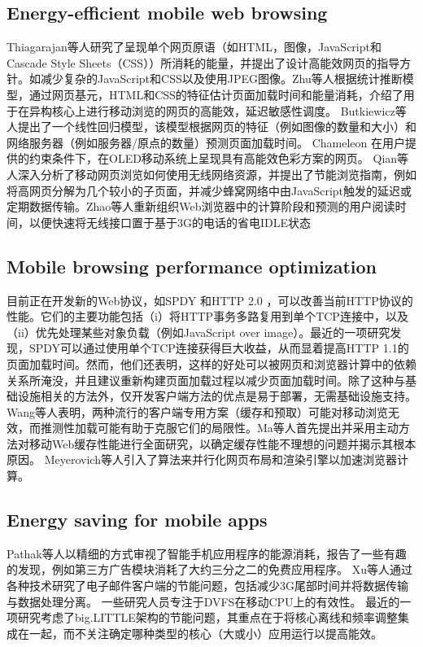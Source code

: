 \documentclass{sig-alternate-05-2015}
\begin{document}
\subsection{Energy-efficient mobile web browsing}

Thiagarajan等人\cite{13}研究了呈现单个网页原语（如HTML，图像，JavaScript和Cascade Style Sheets（CSS））所消耗的能量，并提出了设计高能效网页的指导方针。如减少复杂的JavaScript和CSS以及使用JPEG图像。Zhu等人\cite{14}根据统计推断模型，通过网页基元，HTML和CSS的特征估计页面加载时间和能量消耗，介绍了用于在异构核心上进行移动浏览的网页的高能效，延迟敏感性调度。 Butkiewicz等人\cite{15}提出了一个线性回归模型，该模型根据网页的特征（例如图像的数量和大小）和网络服务器（例如服务器/原点的数量）预测页面加载时间。 Chameleon \cite{16}\cite{17}在用户提供的约束条件下，在OLED移动系统上呈现具有高能效色彩方案的网页。 Qian等人\cite{18}深入分析了移动网页浏览如何使用无线网络资源，并提出了节能浏览指南，例如将高网页分解为几个较小的子页面，并减少蜂窝网络中由JavaScript触发的延迟或定期数据传输。Zhao等人\cite{19}重新组织Web浏览器中的计算阶段和预测的用户阅读时间，以便快速将无线接口置于基于3G的电话的省电IDLE状态

\subsection{Mobile browsing performance optimization}

目前正在开发新的Web协议，如SPDY \cite{20}和HTTP 2.0 \cite{21}，可以改善当前HTTP协议的性能。它们的主要功能包括（i）将HTTP事务多路复用到单个TCP连接中，以及（ii）优先处理某些对象负载（例如JavaScript over image）。最近的一项研究\cite{22}发现，SPDY可以通过使用单个TCP连接获得巨大收益，从而显着提高HTTP 1.1的页面加载时间。然而，他们还表明，这样的好处可以被网页和浏览器计算中的依赖关系所淹没，并且建议重新构建页面加载过程以减少页面加载时间。除了这种与基础设施相关的方法外，仅开发客户端方法的优点是易于部署，无需基础设施支持。 Wang等人\cite{23}表明，两种流行的客户端专用方案（缓存和预取）可能对移动浏览无效，而推测性加载可能有助于克服它们的局限性。Ma等人\cite{24}首先提出并采用主动方法对移动Web缓存性能进行全面研究，以确定缓存性能不理想的问题并揭示其根本原因。 Meyerovich等人\cite{25}引入了算法来并行化网页布局和渲染引擎以加速浏览器计算。

\subsection{Energy saving for mobile apps}

Pathak等人\cite{26}以精细的方式审视了智能手机应用程序的能源消耗，报告了一些有趣的发现，例如第三方广告模块消耗了大约三分之二的免费应用程序。 Xu等人\cite{27}通过各种技术研究了电子邮件客户端的节能问题，包括减少3G尾部时间并将数据传输与数据处理分离。 一些研究人员专注于DVFS在移动CPU上的有效性。 最近的一项研究\cite{28}考虑了big.LITTLE架构的节能问题，其重点在于将核心离线和频率调整集成在一起，而不关注确定哪种类型的核心（大或小）应用运行以提高能效。
\end{document}
